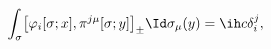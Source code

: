 \begin{equation}	\label{12.47}
\int_\sigma
	\bigl[ \varphi_i[\sigma;x],\pi^{j\mu}[\sigma;y] \bigr]_{\pm}
\Id\sigma_\mu(y)
=
\ih c \delta_i^j ,
	\end{equation}

